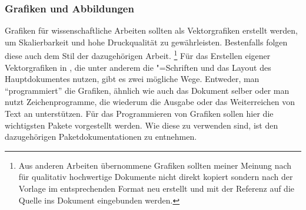 \subsubsection{Grafiken und Abbildungen}
Grafiken für wissenschaftliche Arbeiten sollten als Vektorgrafiken erstellt 
werden, um Skalierbarkeit und hohe Druckqualität zu gewährleisten. Bestenfalls 
folgen diese auch dem Stil der dazugehörigen Arbeit.%
\footnote{%
  Aus anderen Arbeiten übernommene Grafiken sollten meiner Meinung nach für 
  qualitativ hochwertige Dokumente nicht direkt kopiert sondern nach der 
  Vorlage im entsprechenden Format neu erstellt und mit der Referenz auf die 
  Quelle ins Dokument eingebunden werden.
}
Für das Erstellen eigener Vektorgrafiken in , die unter anderem 
die "=Schriften und das Layout des Hauptdokumentes nutzen, gibt
es zwei mögliche Wege. Entweder, man \enquote{programmiert} die Grafiken, 
ähnlich wie auch das Dokument selber oder man nutzt Zeichenprogramme, die 
wiederum die Ausgabe oder das Weiterreichen von Text an  
unterstützen. Für das Programmieren von Grafiken sollen hier die wichtigsten 
Pakete vorgestellt werden. Wie diese zu verwenden sind, ist den dazugehörigen 
Paketdokumentationen zu entnehmen.

